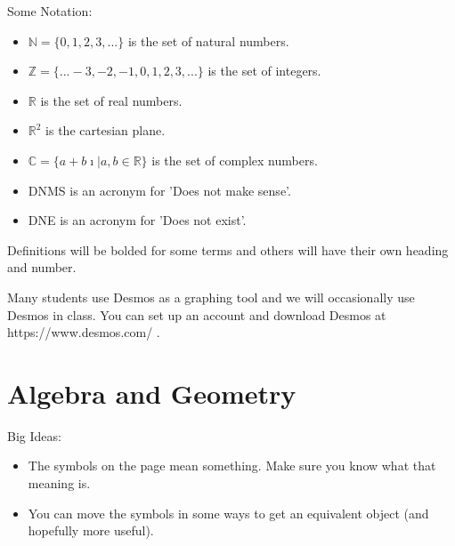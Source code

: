 Some Notation:
\begin{itemize}
\item $\mathbb{N}=\{0,1,2,3,...\}$ is the set of natural numbers.
\item $\mathbb{Z}=\{...-3,-2,-1,0,1,2,3,...\}$ is the set of integers.
\item $\mathbb{R}$ is the set of real numbers.
\item $\mathbb{R}^2$ is the cartesian plane.
\item $\mathbb{C}=\{a+b \imath | a,b \in \mathbb{R}\}$ is the set of complex numbers.
\item DNMS is an acronym for 'Does not make sense'.
\item DNE is an acronym for 'Does not exist'.
\end{itemize}
Definitions will be bolded for some terms and others will have their own heading and number.

Many students use Desmos as a graphing tool and we will occasionally use Desmos in class. You can set up an account and download Desmos at https://www.desmos.com/ .


\mainmatter




\chapter{Algebra and Geometry}
\begin{annotation}
\end{annotation}
Big Ideas:
\begin{itemize}
\item The symbols on the page mean something. Make sure you know what that meaning is.
\item You can move the symbols in some ways to get an equivalent object (and hopefully more useful).
\end{itemize}

